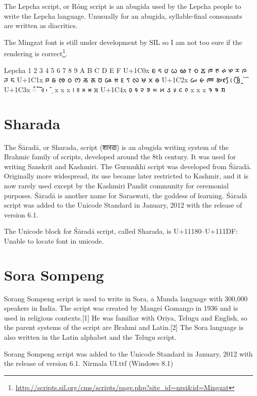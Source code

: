 The Lepcha script, or Róng script is an abugida used by the Lepcha people to write the Lepcha language. Unusually for an abugida, syllable-final consonants are written as diacritics.

The Mingzat font is still under development by SIL so I am not too sure if the rendering is correct\footnote{\url{http://scripts.sil.org/cms/scripts/page.php?site_id=nrsi&id=Mingzat}}.

\begin{scriptexample}[]{Lepcha}
\bgroup
\lepcha
{}	1	2	3	4	5	6	7	8	9	A	B	C	D	E	F
U+1C0x	 ᰀ	ᰁ	ᰂ	ᰃ	ᰄ	ᰅ	ᰆ	ᰇ	ᰈ	ᰉ	ᰊ	ᰋ	ᰌ	ᰍ	ᰎ	ᰏ
U+1C1x	 ᰐ	ᰑ	ᰒ	ᰓ	ᰔ	ᰕ	ᰖ	ᰗ	ᰘ	ᰙ	ᰚ	ᰛ	ᰜ	ᰝ	ᰞ	ᰟ
U+1C2x	 ᰠ	ᰡ	ᰢ	ᰣ	ᰤ	ᰥ	ᰦ	ᰧ	ᰨ	ᰩ	ᰪ	ᰫ	ᰬ	ᰭ	ᰮ	ᰯ
U+1C3x	 ᰰ	ᰱ	ᰲ	ᰳ	ᰴ	ᰵ	ᰶ	᰷	x	x	x	᰻	᰼	᰽	᰾	᰿
U+1C4x	 ᱀	᱁	᱂	᱃	᱄	᱅	᱆	᱇	᱈	᱉	x	x	x	ᱍ	ᱎ	ᱏ

\egroup
\end{scriptexample}

\section{Sharada}

The Śāradā, or Sharada, script (शारदा) is an abugida writing system of the Brahmic family of scripts, developed around the 8th century. It was used for writing Sanskrit and Kashmiri. The Gurmukhī script was developed from Śāradā. Originally more widespread, its use became later restricted to Kashmir, and it is now rarely used except by the Kashmiri Pandit community for ceremonial purposes. Śāradā is another name for Saraswati, the goddess of learning.
Śāradā script was added to the Unicode Standard in January, 2012 with the release of version 6.1.

The Unicode block for Śāradā script, called Sharada, is U+11180–U+111DF: Unable to locate font in unicode.


\section{Sora Sompeng}

Sorang Sompeng script is used to write in Sora, a Munda language with 300,000 speakers in India. The script was created by Mangei Gomango in 1936 and is used in religious contexts.[1] He was familiar with Oriya, Telugu and English, so the parent systems of the script are Brahmi and Latin.[2]
The Sora language is also written in the Latin alphabet and the Telugu script.

Sorang Sompeng script was added to the Unicode Standard in January, 2012 with the release of version 6.1. Nirmala UI.ttf (Windows 8.1)
\newfontfamily{}


